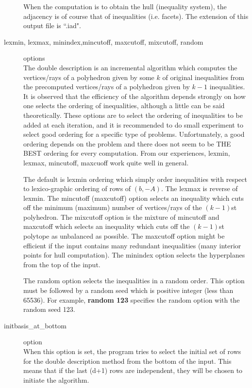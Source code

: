 \begin{description}
When the computation is to obtain the hull (inequality system),
the adjacency is of course that of inequalities (i.e. facets).
The extension of this output file is ``.iad".

\item[lexmin, lexmax, minindex,mincutoff, maxcutoff, mixcutoff, random] options\\
The double description is an incremental algorithm which
computes the vertices/rays of a polyhedron given by some $k$ of
original inequalities from the precomputed vertices/rays of a
polyhedron given by $k-1$ inequalities.  It is observed that
the efficiency of the algorithm depends strongly on how
one selects the ordering of inequalities, although a little
can be said theoretically.
These options are to select the ordering of inequalities to be
added at each iteration, and it is recommended to do small
experiment to select good ordering for a specific type of problems.
Unfortunately, a good ordering depends on the problem and there does not seem 
to be THE BEST ordering for every computation.  From our experiences,
lexmin, lexmax, mincutoff, maxcuoff work quite well in general.

The default is lexmin ordering which simply order inequalities
with respect to lexico-graphic ordering of rows of $(b, -A)$.  The lexmax
is reverse of lexmin.  The mincutoff (maxcutoff) option selects an inequality which
cuts off the minimum (maximum) number of vertices/rays of the $(k-1)$st polyhedron. 
The mixcutoff option is the mixture of mincutoff and maxcutoff which selects
an inequality which cuts off the $(k-1)$st polytope as unbalanced as possible.
The maxcutoff option might be efficient if the input contains
many redundant inequalities (many interior points for hull computation).
The minindex option selects the hyperplanes from the top of
the input.

The random option selects the inequalities in a random order.  This option
must be followed by a random seed which is positive integer (less than
65536).  For example, {\bf random 123} specifies the random option with
the random seed 123. 

\item[initbasis\_at\_bottom] option\\
When this option is set, the program tries to select
the initial set of rows for the double description
method from the bottom of the input.  This means that
if the last (d+1) rows are independent, 
they will be chosen to initiate the algorithm.


\end{description}
